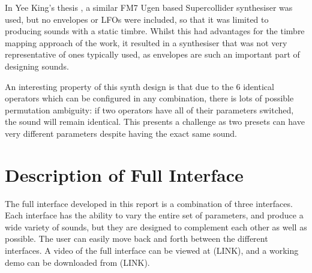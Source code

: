 \documentclass[11pt, oneside]{report}   	%
\begin{document}
In Yee King's thesis \cite{YeeKing}, a similar FM7 Ugen based Supercollider synthesiser was used, but no envelopes or LFOs were included, so that it was limited to producing sounds with a static timbre. Whilst this had advantages for the timbre mapping approach of the work, it resulted in a synthesiser that was not very representative of ones typically used, as envelopes are such an important part of designing sounds. 

An interesting property of this synth design is that due to the 6 identical operators which can be configured in any combination, there is lots of possible permutation ambiguity: if two operators have all of their parameters switched, the sound will remain identical. This presents a challenge as two presets can have very different parameters despite having the exact same sound. 


\chapter{Description of Full Interface}
The full interface developed in this report is a combination of three interfaces. Each interface has the ability to vary the entire set of parameters, and produce a wide variety of sounds, but they are designed to complement each other as well as possible. The user can easily move back and forth between the different interfaces. A video of the full interface can be viewed at (LINK), and a working demo can be downloaded from (LINK).
\end{document}
